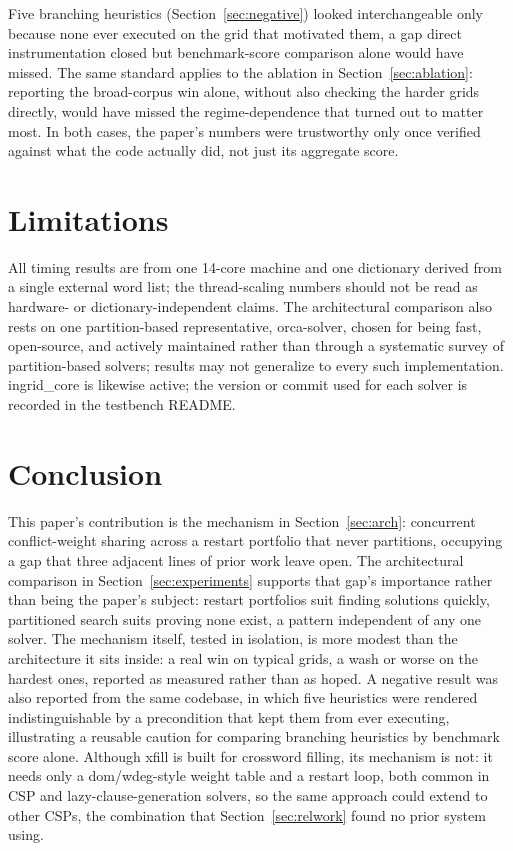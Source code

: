 \documentclass[conference]{IEEEtran}
\begin{document}
Five branching heuristics (Section~\ref{sec:negative}) looked interchangeable only because none ever executed on the grid that motivated them, a gap direct instrumentation closed but benchmark-score comparison alone would have missed. The same standard applies to the ablation in Section~\ref{sec:ablation}: reporting the broad-corpus win alone, without also checking the harder grids directly, would have missed the regime-dependence that turned out to matter most. In both cases, the paper's numbers were trustworthy only once verified against what the code actually did, not just its aggregate score.

\section{Limitations}

All timing results are from one 14-core machine and one dictionary derived from a single external word list; the thread-scaling numbers should not be read as hardware- or dictionary-independent claims. The architectural comparison also rests on one partition-based representative, orca-solver, chosen for being fast, open-source, and actively maintained rather than through a systematic survey of partition-based solvers; results may not generalize to every such implementation. ingrid\_core is likewise active; the version or commit used for each solver is recorded in the testbench README.

\section{Conclusion}

This paper's contribution is the mechanism in Section~\ref{sec:arch}: concurrent conflict-weight sharing across a restart portfolio that never partitions, occupying a gap that three adjacent lines of prior work leave open. The architectural comparison in Section~\ref{sec:experiments} supports that gap's importance rather than being the paper's subject: restart portfolios suit finding solutions quickly, partitioned search suits proving none exist, a pattern independent of any one solver. The mechanism itself, tested in isolation, is more modest than the architecture it sits inside: a real win on typical grids, a wash or worse on the hardest ones, reported as measured rather than as hoped. A negative result was also reported from the same codebase, in which five heuristics were rendered indistinguishable by a precondition that kept them from ever executing, illustrating a reusable caution for comparing branching heuristics by benchmark score alone. Although xfill is built for crossword filling, its mechanism is not: it needs only a dom/wdeg-style weight table and a restart loop, both common in CSP and lazy-clause-generation solvers, so the same approach could extend to other CSPs, the combination that Section~\ref{sec:relwork} found no prior system using.
\end{document}
